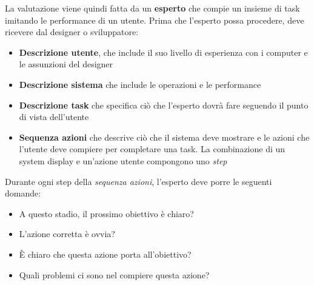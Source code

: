 La valutazione viene quindi fatta da un \textbf{esperto} che compie un insieme di task imitando le performance di un utente. Prima che l'esperto possa procedere, deve ricevere dal designer o sviluppatore:
\begin{itemize}
	\item \textbf{Descrizione utente}, che include il suo livello di esperienza con i computer e le assunzioni del designer
	\item \textbf{Descrizione sistema} che include le operazioni e le performance
	\item \textbf{Descrizione task} che specifica ciò che l'esperto dovrà fare seguendo il punto di vista dell'utente
	\item \textbf{Sequenza azioni} che descrive ciò che il sistema deve mostrare e le azioni che l'utente deve compiere per completare una task. La combinazione di un system display e un'azione utente compongono uno \textit{step}
\end{itemize}
Durante ogni step della \textit{sequenza azioni}, l'esperto deve porre le seguenti domande:
\begin{itemize}
	\item A questo stadio, il prossimo obiettivo è chiaro?
	\item L'azione corretta è ovvia?
	\item È chiaro che questa azione porta all'obiettivo?
	\item Quali problemi ci sono nel compiere questa azione?
\end{itemize}

\newpage
